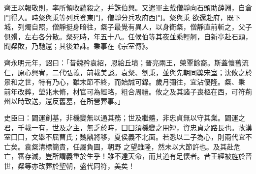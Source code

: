\begin{pinyinscope}
 齊王以報敬則，率所領收蘊殺之，并誅伯興。又遣軍主戴僧靜向石頭助薛淵，自倉門得入。時粲與秉等列兵登東門，僧靜分兵攻府西門。粲與秉
 欲還赴府，既下城，列燭自照，僧靜挺身暗往，粲子最覺有異人，以身衛粲，僧靜直前斬之，父子俱殞，左右各分散。粲死時，年五十八。任候伯等其夜並乘輕舸，自新亭赴石頭，聞粲敗，乃馳還；其後並誅。秉事在《宗室傳》。



 齊永明元年，詔曰：「昔魏矜袁紹，恩給丘墳；晉亮兩王，榮覃餘裔。斯蓋懷舊流仁，原心興宥，二代弘義，前載美談。袁粲、劉秉，並與先朝同獎宋室；沈攸之於景和之世，特有乃心，雖末節不終，而始誠可錄。歲月彌往，宜沾優隆。粲、秉
 前年改葬，塋兆未脩，材官可為經略，粗合周禮。攸之及其諸子喪柩在西，可符荊州以時致送，還反舊墓，在所營葬事。」



 史臣曰：闢運創基，非機變無以通其務；世及繼體，非忠貞無以守其業。闢運之君，千載一有，世及之主，無乏於時，囗囗須機變之用短，資忠貞之路長也。故漢室囗囗，文舉不屈曹氏；魏鼎將移，夏侯義不北面。若悉以二子為心，則兩代宜不亡矣。袁粲清標簡貴，任屬負圖，朝野
 之望雖隆，然未以大節許也。及其赴危亡，審存滅，豈所謂義重於生乎！雖不達天命，而其道有足懷者。昔王經被旌於晉世，粲等亦改葬於聖朝，盛代同符，美矣！



\end{pinyinscope}